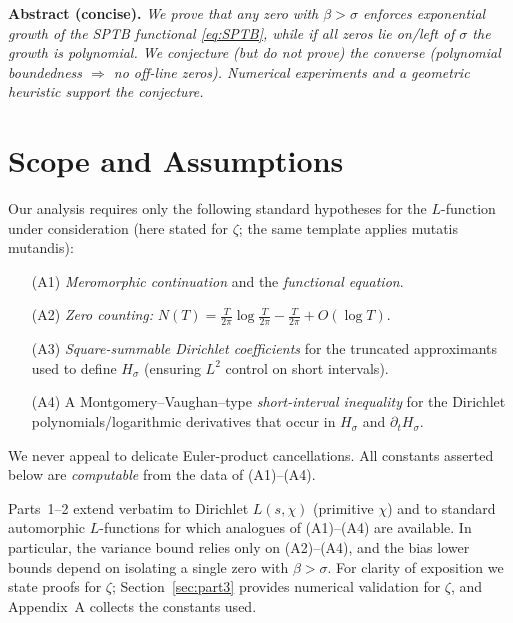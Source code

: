 \medskip
\noindent
\textbf{Abstract (concise).}
\emph{We prove that any zero with $\beta>\sigma$ enforces exponential growth of the
SPTB functional \eqref{eq:SPTB}, while if all zeros lie on/left of $\sigma$ the growth
is polynomial.  We conjecture (but do not prove) the converse
(polynomial boundedness $\Rightarrow$ no off-line zeros).  Numerical experiments
and a geometric heuristic support the conjecture.}

\section{Scope and Assumptions}

Our analysis requires only the following standard hypotheses for the $L$-function under
consideration (here stated for $\zeta$; the same template applies mutatis mutandis):
\begin{enumerate}
\item[(A1)] \emph{Meromorphic continuation} and the \emph{functional equation}.
\item[(A2)] \emph{Zero counting:} $N(T)=\tfrac{T}{2\pi}\log\tfrac{T}{2\pi}-\tfrac{T}{2\pi}
            +O(\log T)$.
\item[(A3)] \emph{Square-summable Dirichlet coefficients} for the truncated approximants used to
            define $H_\sigma$ (ensuring $L^2$ control on short intervals).
\item[(A4)] A Montgomery–Vaughan–type \emph{short-interval inequality} for the Dirichlet
            polynomials/logarithmic derivatives that occur in $H_\sigma$ and $\partial_t H_\sigma$.
\end{enumerate}
We never appeal to delicate Euler-product cancellations.  All constants asserted below are
\emph{computable} from the data of (A1)–(A4).

\begin{remark}
Parts~1–2 extend verbatim to Dirichlet $L(s,\chi)$ (primitive $\chi$) and to standard automorphic
$L$-functions for which analogues of (A1)–(A4) are available.  In particular, the variance bound
relies only on (A2)–(A4), and the bias lower bounds depend on isolating a single zero with
$\beta>\sigma$.  For clarity of exposition we state proofs for $\zeta$; Section~\ref{sec:part3}
provides numerical validation for $\zeta$, and Appendix~A collects the constants used.
\end{remark}


